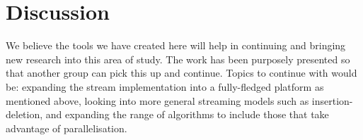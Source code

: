 \section{Discussion}

We believe the tools we have created here will help in continuing and bringing
new research into this area of study. The work has been purposely presented so
that another group can pick this up and continue. Topics to continue with would
be: expanding the stream implementation into a fully-fledged platform as
mentioned above, looking into more general streaming models such as
insertion-deletion, and expanding the range of algorithms to include those that
take advantage of parallelisation.
